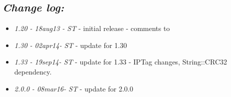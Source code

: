 \subsection{\itshape Change log:}

\begin{itemize}
\item {\itshape 1.20 - 18aug13 - ST} - initial release - comments to
  {\itshape \Email}
\item {\itshape 1.30 - 02apr14- ST} - update for 1.30
\item {\itshape 1.33 - 19sep14- ST} - update for 1.33 - IPTag changes,
String::CRC32 dependency.
\item {\itshape 2.0.0 - 08mar16- ST} - update for 2.0.0
\end{itemize}


